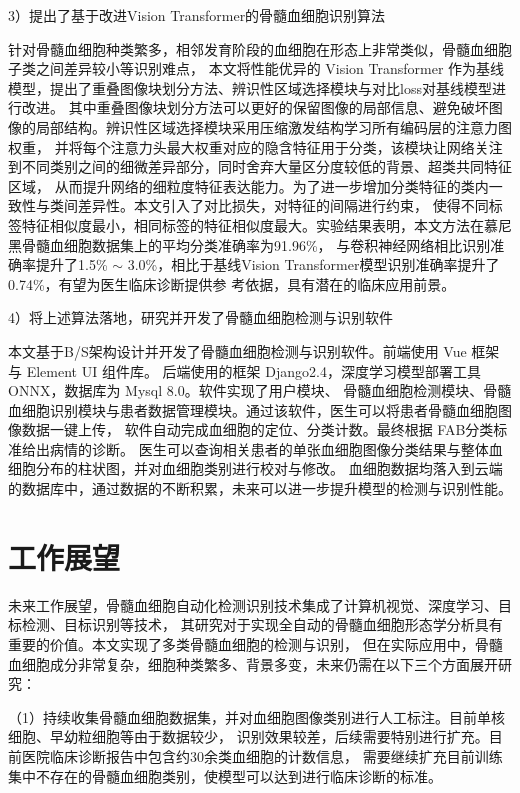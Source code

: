 3）提出了基于改进Vision Transformer的骨髓血细胞识别算法

针对骨髓血细胞种类繁多，相邻发育阶段的血细胞在形态上非常类似，骨髓血细胞子类之间差异较小等识别难点，
本文将性能优异的 Vision Transformer 作为基线模型，提出了重叠图像块划分方法、辨识性区域选择模块与对比loss对基线模型进行改进。
其中重叠图像块划分方法可以更好的保留图像的局部信息、避免破坏图像的局部结构。辨识性区域选择模块采用压缩激发结构学习所有编码层的注意力图权重，
并将每个注意力头最大权重对应的隐含特征用于分类，该模块让网络关注到不同类别之间的细微差异部分，同时舍弃大量区分度较低的背景、超类共同特征区域，
从而提升网络的细粒度特征表达能力。为了进一步增加分类特征的类内一致性与类间差异性。本文引入了对比损失，对特征的间隔进行约束，
使得不同标签特征相似度最小，相同标签的特征相似度最大。实验结果表明，本文方法在慕尼黑骨髓血细胞数据集上的平均分类准确率为91.96\%，
与卷积神经网络相比识别准确率提升了1.5\% $\sim$ 3.0\%，相比于基线Vision Transformer模型识别准确率提升了0.74\%，有望为医生临床诊断提供参
考依据，具有潜在的临床应用前景。

4）将上述算法落地，研究并开发了骨髓血细胞检测与识别软件

本文基于B/S架构设计并开发了骨髓血细胞检测与识别软件。前端使用 Vue 框架与 Element UI 组件库。
后端使用的框架 Django2.4，深度学习模型部署工具 ONNX，数据库为 Mysql 8.0。软件实现了用户模块、
骨髓血细胞检测模块、骨髓血细胞识别模块与患者数据管理模块。通过该软件，医生可以将患者骨髓血细胞图像数据一键上传，
软件自动完成血细胞的定位、分类计数。最终根据 FAB分类标准给出病情的诊断。
医生可以查询相关患者的单张血细胞图像分类结果与整体血细胞分布的柱状图，并对血细胞类别进行校对与修改。
血细胞数据均落入到云端的数据库中，通过数据的不断积累，未来可以进一步提升模型的检测与识别性能。

\section{工作展望}

未来工作展望，骨髓血细胞自动化检测识别技术集成了计算机视觉、深度学习、目标检测、目标识别等技术，
其研究对于实现全自动的骨髓血细胞形态学分析具有重要的价值。本文实现了多类骨髓血细胞的检测与识别，
但在实际应用中，骨髓血细胞成分非常复杂，细胞种类繁多、背景多变，未来仍需在以下三个方面展开研究：

（1）持续收集骨髓血细胞数据集，并对血细胞图像类别进行人工标注。目前单核细胞、早幼粒细胞等由于数据较少，
识别效果较差，后续需要特别进行扩充。目前医院临床诊断报告中包含约30余类血细胞的计数信息，
需要继续扩充目前训练集中不存在的骨髓血细胞类别，使模型可以达到进行临床诊断的标准。

